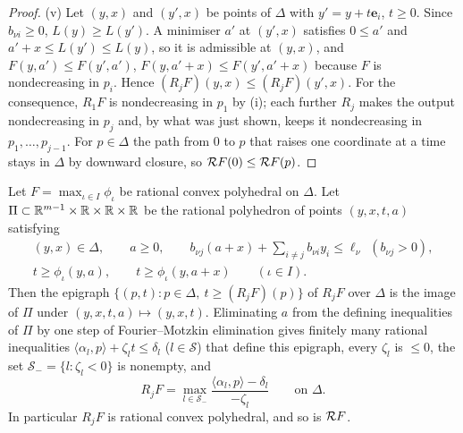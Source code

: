 \begin{proof}
(v) Let $(y,x)$ and $(y',x)$ be points of $\Delta$ with $y'=y+t\mathbf e_i$, $t\ge0$. Since $b_{\nu i}\ge0$,
$L(y)\ge L(y')$. A minimiser $a'$ at $(y',x)$ satisfies $0\le a'$ and $a'+x\le L(y')\le L(y)$, so it is admissible at
$(y,x)$, and $F(y,a')\le F(y',a')$, $F(y,a'+x)\le F(y',a'+x)$ because $F$ is nondecreasing in $p_i$. Hence
$(R_jF)(y,x)\le(R_jF)(y',x)$. For the consequence, $R_1F$ is nondecreasing in $p_1$ by (i); each further $R_j$
makes the output nondecreasing in $p_j$ and, by what was just shown, keeps it nondecreasing in $p_1,\dots,p_{j-1}$.
For $p\in\Delta$ the path from $0$ to $p$ that raises one coordinate at a time stays in $\Delta$ by downward closure,
so $\mathcal{R} F(0)\le\mathcal{R} F(p)$.
\end{proof}

\begin{lemma}\label{lem:fcp-polyhedral}
Let $F=\max_{\iota\in I}\phi_\iota$ be rational convex polyhedral on $\Delta$. Let
$\Pi\subset\mathbb{R}^{m-1}\times\mathbb{R}\times\mathbb{R}\times\mathbb{R}$ be the rational polyhedron of points $(y,x,t,a)$ satisfying
\begin{gather*}
 (y,x)\in\Delta,\qquad a\ge0,\qquad b_{\nu j}(a+x)+\textstyle\sum_{i\ne j}b_{\nu i}y_i\le\ell_\nu\ \ (b_{\nu j}>0),\\
 t\ge\phi_\iota(y,a),\qquad t\ge\phi_\iota(y,a+x)\qquad(\iota\in I).
\end{gather*}
Then the epigraph $\{(p,t):p\in\Delta,\ t\ge(R_jF)(p)\}$ of $R_jF$ over $\Delta$ is the image of $\Pi$ under
$(y,x,t,a)\mapsto(y,x,t)$. Eliminating $a$ from the defining inequalities of $\Pi$ by one step of Fourier--Motzkin
elimination gives finitely many rational inequalities $\langle\alpha_l,p\rangle+\zeta_lt\le\delta_l$
($l\in\mathcal S$) that define this epigraph, every $\zeta_l$ is $\le0$, the set $\mathcal S_-=\{l:\zeta_l<0\}$ is
nonempty, and
\[
 R_jF=\max_{l\in\mathcal S_-}\frac{\langle\alpha_l,p\rangle-\delta_l}{-\zeta_l}\qquad\text{on }\Delta .
\]
In particular $R_jF$ is rational convex polyhedral, and so is $\mathcal{R} F$.
\end{lemma}

